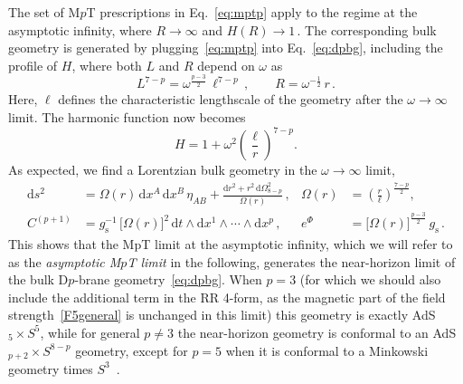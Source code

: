 \documentclass[11pt]{article}
\newcommand{\be}{\begin{equation}}
\newcommand{\ee}{\end{equation}}
\renewcommand{\emph}[1]{\textit{#1}}
\newcommand{\dd}{\mathrm{d}}
\begin{document}
The set of M$p$T prescriptions in Eq.~\eqref{eq:mptp} apply to the regime at the asymptotic infinity, where $R \rightarrow \infty$ and $H (R) \rightarrow 1$\,. The corresponding bulk geometry is generated by 
plugging~\eqref{eq:mptp} into Eq.~\eqref{eq:dpbg}, including the profile of $H$, where both $L$ and $R$ depend on $\omega$ as
%
\be
    L^{7-p} = \omega^{\frac{p-3}{2}} \, \ell^{7-p}\,,
        \qquad%
    R = \omega^{-\frac{1}{2}} \, r\,.
\ee
%
Here, $\ell$ defines the characteristic lengthscale of the geometry after the $\omega \rightarrow \infty$ limit. The harmonic function now becomes
%
\be
    H = 1 + \omega^2 \left( \frac{\ell}{r} \right)^{\!\!7-p}\!\!.
\ee 
%
As expected, we find a Lorentzian bulk geometry in the $\omega \rightarrow \infty$ limit,
%
\begin{subequations} \label{eq:dsco}
\begin{align}
    \dd s^2 & = \mathbb{\Omega}(r) \, \dd x^A \, \dd x^B \, \eta^{}_{AB}
    + \frac{\dd r^2 + r^2 \, \dd\Omega^2_{8-p}}{\mathbb{\Omega}(r)}\,, 
        &%
    \mathbb{\Omega}(r) & = \left( \frac{r}{\ell} \right)^{\frac{7-p}{2}}, \\[4pt]
    C^{(p+1)} & = g^{-1}_\text{s} \, \bigl[ \mathbb{\Omega}(r) \bigr]^2 \, \dd t \wedge \dd x^1 \wedge \cdots \wedge \dd x^p\,, 
       &%
    e^\Phi & = \bigl[ \mathbb{\Omega}(r) \bigr]^{\frac{p-3}{2}} \, g^{}_\text{s}\,.
\end{align}
\end{subequations}
% 
This shows that the MpT limit at the asymptotic infinity, which we will refer to as the \emph{asymptotic M$p$T limit} in the following, generates the near-horizon limit of the bulk D$p$-brane geometry~\eqref{eq:dpbg}. 
When $p=3$ (for which we should also include the additional term in the RR 4-form, as the magnetic part of the field strength~\eqref{F5general} is unchanged in this limit) this geometry is exactly AdS${}_5 \times S^5$, while for general $p \neq 3$ the near-horizon geometry is conformal to an AdS${}_{p+2} \times S^{8-p}$ geometry, except for $p=5$ when it is conformal to a Minkowski geometry times $S^3$~\cite{Boonstra:1997dy,Boonstra:1998mp}. 
%
\end{document}
